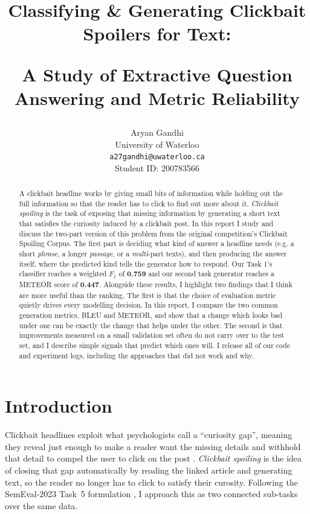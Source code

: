 \documentclass[11pt]{article}
\title{Classifying \& Generating Clickbait Spoilers for Text:


A Study of Extractive Question Answering and Metric Reliability}
\author{Aryan Gandhi \\
  University of Waterloo \\
  \texttt{a27gandhi@uwaterloo.ca} \\
  Student ID: 200783566}
\begin{document}
\maketitle

\begin{abstract}
A clickbait headline works by giving small bits of information while holding out
the full information so that the reader has to click to find out more about it. \textit{Clickbait
spoiling} is the task of exposing that missing information by generating a short text that satisfies the curiosity induced by a clickbait post. In this report I study and discuss the two-part version of this problem from the original competition's Clickbait
Spoiling Corpus. The first part is deciding what kind of answer a headline needs (e.g. a short
\textit{phrase}, a longer \textit{passage}, or a \textit{multi}-part texts), and
then producing the answer itself, where the predicted kind tells the generator
how to respond. Our Task 1's classifier reaches a weighted $F_1$ of
\textbf{0.759} and our second task generator reaches a METEOR
score of \textbf{0.447}. Alongside these results, I highlight two
findings that I think are more useful than the ranking. The first is that the
choice of evaluation metric quietly drives every modelling decision. In this report, I compare the two common generation metrics, BLEU and METEOR, and show that a change which
looks bad under one can be exactly the change that helps under the other. The
second is that improvements measured on a small validation set often do not carry
over to the test set, and I describe simple signals that predict which ones
will. I release all of our code and experiment logs, including the approaches
that did not work and why.
\end{abstract}


\section{Introduction}
\label{sec:intro}
Clickbait headlines exploit what psychologists call a ``curiosity gap'', meaning they
reveal just enough to make a reader want the missing details and withhold that
detail to compel the user to click on the post \citep{loewenstein1994}. \textit{Clickbait spoiling}
\citep{hagen2022} is the idea of closing that gap automatically by reading the
linked article and generating text, so the reader no longer has
to click to satisfy their curosity. Following the SemEval-2023 Task~5 formulation \citep{semeval2023task5},
I approach this as two connected sub-tasks over the same data.
\end{document}
